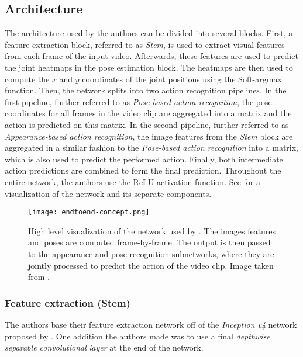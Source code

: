 \subsection{Architecture}
The architecture used by the authors can be divided into several blocks.
First, a feature extraction block, referred to as \textit{Stem}, is used to extract visual features from each frame of the input video.
Afterwards, these features are used to predict the joint heatmaps in the pose estimation block.
The heatmaps are then used to compute the $x$ and $y$ coordinates of the joint positions using the Soft-argmax function.
Then, the network splits into two action recognition pipelines.
In the first pipeline, further referred to as \textit{Pose-based action recognition}, the pose coordinates for all frames in the video clip are aggregated into a matrix and the action is predicted on this matrix.
In the second pipeline, further referred to as \textit{Appearance-based action recognition}, the image features from the \textit{Stem} block are aggregated in a similar fashion to the \textit{Pose-based action recognition} into a matrix, which is also used to predict the performed action.
Finally, both intermediate action predictions are combined to form the final prediction.
Throughout the entire network, the authors use the ReLU activation function.
See  for a visualization of the network and its separate components.

\begin{figure}[htb!]
    \centering
    \texttt{[image: endtoend-concept.png]}
    \caption{High level visualization of the network used by \cite{luvizon_2d/3d_2018}. The images features and poses are computed frame-by-frame. The output is then passed to the appearance and pose recognition subnetworks, where they are jointly processed to predict the action of the video clip. Image taken from \cite{luvizon_2d/3d_2018}.}
    \label{fig:luvizon_overview}
\end{figure}

\subsubsection{Feature extraction (Stem)}
The authors base their feature extraction network off of the \textit{Inception v4} network proposed by \cite{szegedy_inception-v4_2017}.
One addition the authors made was to use a final \textit{depthwise separable convolutional layer} at the end of the network.

